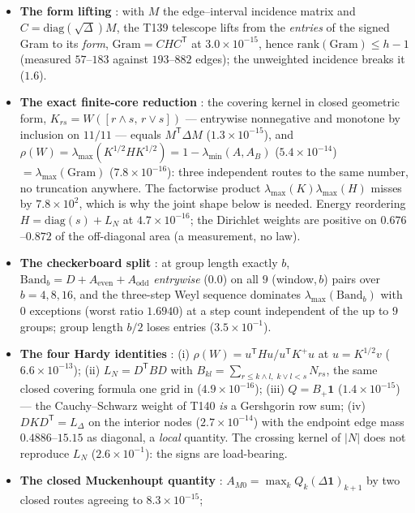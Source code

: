 \documentclass[11pt,a4paper]{article}
\begin{document}
\begin{itemize}[leftmargin=1.5em]
\item \textbf{The form lifting} \mE: with $M$ the edge--interval incidence matrix and
$C=\mathrm{diag}(\sqrt\Delta)M$, the T139 telescope lifts from the \emph{entries} of the signed Gram
to its \emph{form}, $\mathrm{Gram}=CHC^{\mathsf T}$ at $3.0\times10^{-15}$, hence
$\mathrm{rank}(\mathrm{Gram})\le h-1$ (measured $57$--$183$ against $193$--$882$ edges); the
unweighted incidence breaks it ($1.6$).
\item \textbf{The exact finite-core reduction} \mE: the covering kernel in closed geometric form,
$K_{rs}=W([r\wedge s,\,r\vee s])$ --- entrywise nonnegative and monotone by inclusion on $11/11$ ---
equals $M^{\mathsf T}\Delta M$ ($1.3\times10^{-15}$), and
$\rho(W)=\lambda_{\max}(K^{1/2}HK^{1/2})=1-\lambda_{\min}(A,A_B)$ ($5.4\times10^{-14}$)
$=\lambda_{\max}(\mathrm{Gram})$ ($7.8\times10^{-16}$): three independent routes to the same number,
no truncation anywhere. The factorwise product $\lambda_{\max}(K)\lambda_{\max}(H)$ misses by
$7.8\times10^{2}$, which is why the joint shape below is needed. Energy reordering
$H=\mathrm{diag}(s)+L_N$ at $4.7\times10^{-16}$; the Dirichlet weights are positive on
$0.676$--$0.872$ of the off-diagonal area (a measurement, no law).
\item \textbf{The checkerboard split} \mE: at group length exactly $b$,
$\mathrm{Band}_b=D+A_{\mathrm{even}}+A_{\mathrm{odd}}$ \emph{entrywise} ($0.0$) on all $9$
(window,\,$b$) pairs over $b=4,8,16$, and the three-step Weyl sequence dominates
$\lambda_{\max}(\mathrm{Band}_b)$ with $0$ exceptions (worst ratio $1.6940$) at a step count
independent of the up to $9$ groups; group length $b/2$ loses entries ($3.5\times10^{-1}$).
\item \textbf{The four Hardy identities} \mE: (i) $\rho(W)=u^{\mathsf T}Hu/u^{\mathsf T}K^{+}u$ at
$u=K^{1/2}v$ ($6.6\times10^{-13}$); (ii) $L_N=D^{\mathsf T}BD$ with
$B_{kl}=\sum_{r\le k\wedge l,\;k\vee l<s}N_{rs}$, the same closed covering formula one grid in
($4.9\times10^{-16}$); (iii) $Q=B_+\mathbf 1$ ($1.4\times10^{-15}$) --- the Cauchy--Schwarz weight
of T140 \emph{is} a Gershgorin row sum; (iv) $DKD^{\mathsf T}=L_\Delta$ on the interior nodes
($2.7\times10^{-14}$) with the endpoint edge mass $0.4886$--$15.15$ as diagonal, a \emph{local}
quantity. The crossing kernel of $|N|$ does not reproduce $L_N$ ($2.6\times10^{-1}$): the signs are
load-bearing.
\item \textbf{The closed Muckenhoupt quantity} \mE:
$A_{M0}=\max_kQ_k(\Delta\mathbf 1)_{k+1}$ by two closed routes agreeing to $8.3\times10^{-15}$;

\end{itemize}
\end{document}
